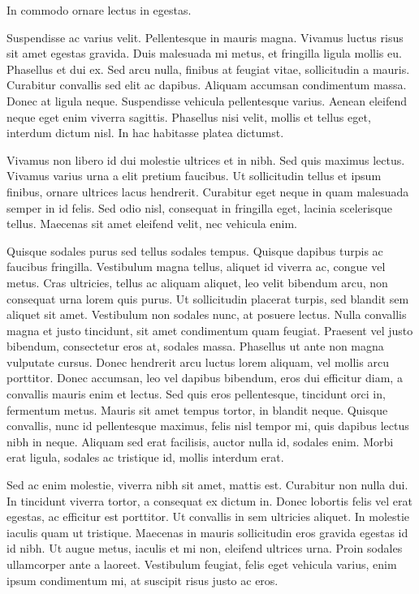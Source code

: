 \documentclass[a4paper,twoside,notitlepage,openright,11pt]{report}
\begin{document}
\begin{corollary}
  In commodo ornare lectus in egestas.
\end{corollary}


Suspendisse ac varius velit. Pellentesque in mauris magna. Vivamus luctus risus sit amet egestas gravida. Duis malesuada mi metus, et fringilla ligula mollis eu. Phasellus et dui ex. Sed arcu nulla, finibus at feugiat vitae, sollicitudin a mauris. Curabitur convallis sed elit ac dapibus. Aliquam accumsan condimentum massa. Donec at ligula neque. Suspendisse vehicula pellentesque varius. Aenean eleifend neque eget enim viverra sagittis. Phasellus nisi velit, mollis et tellus eget, interdum dictum nisl. In hac habitasse platea dictumst.

Vivamus non libero id dui molestie ultrices et in nibh. Sed quis maximus lectus. Vivamus varius urna a elit pretium faucibus. Ut sollicitudin tellus et ipsum finibus, ornare ultrices lacus hendrerit. Curabitur eget neque in quam malesuada semper in id felis. Sed odio nisl, consequat in fringilla eget, lacinia scelerisque tellus. Maecenas sit amet eleifend velit, nec vehicula enim.


Quisque sodales purus sed tellus sodales tempus. Quisque dapibus turpis ac faucibus fringilla. Vestibulum magna tellus, aliquet id viverra ac, congue vel metus. Cras ultricies, tellus ac aliquam aliquet, leo velit bibendum arcu, non consequat urna lorem quis purus. Ut sollicitudin placerat turpis, sed blandit sem aliquet sit amet. Vestibulum non sodales nunc, at posuere lectus. Nulla convallis magna et justo tincidunt, sit amet condimentum quam feugiat. Praesent vel justo bibendum, consectetur eros at, sodales massa. Phasellus ut ante non magna vulputate cursus. Donec hendrerit arcu luctus lorem aliquam, vel mollis arcu porttitor. Donec accumsan, leo vel dapibus bibendum, eros dui efficitur diam, a convallis mauris enim et lectus. Sed quis eros pellentesque, tincidunt orci in, fermentum metus. Mauris sit amet tempus tortor, in blandit neque. Quisque convallis, nunc id pellentesque maximus, felis nisl tempor mi, quis dapibus lectus nibh in neque. Aliquam sed erat facilisis, auctor nulla id, sodales enim. Morbi erat ligula, sodales ac tristique id, mollis interdum erat.

Sed ac enim molestie, viverra nibh sit amet, mattis est. Curabitur non nulla dui. In tincidunt viverra tortor, a consequat ex dictum in. Donec lobortis felis vel erat egestas, ac efficitur est porttitor. Ut convallis in sem ultricies aliquet. In molestie iaculis quam ut tristique. Maecenas in mauris sollicitudin eros gravida egestas id id nibh. Ut augue metus, iaculis et mi non, eleifend ultrices urna. Proin sodales ullamcorper ante a laoreet. Vestibulum feugiat, felis eget vehicula varius, enim ipsum condimentum mi, at suscipit risus justo ac eros.
\end{document}
